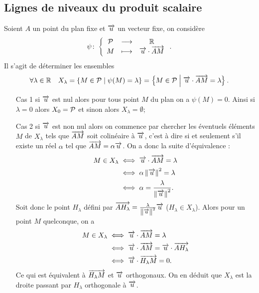 \subsection{Lignes de niveaux du produit scalaire}
Soient \(A\) un point du plan fixe et \(\vu\) un vecteur fixe, on considère
\begin{equation}
  \fonction{\psi}{\P}{\R}{M}{\vu\cdot\vect{AM}}.
\end{equation}
Il s'agit de déterminer les ensembles
\begin{equation}
  \forall \lambda \in \R \quad  X_\lambda = \enstq{M \in \P}{\psi(M)=\lambda}=\enstq{M \in \P}{\vu \cdot \vect{AM} = \lambda}.
\end{equation}
\begin{itemize}
\item[Cas 1] si \(\vu\) est nul alors pour tous point \(M\) du plan on a \(\psi(M)=0\). Ainsi si \(\lambda=0\) alors \(X_0=\P\) et sinon alors \(X_\lambda=\emptyset\);
\item[Cas 2] si \(\vu\) est non nul alors on commence par chercher les éventuels éléments \(M\) de \(X_\lambda\) tels que \(\vect{AM}\) soit colinéaire à \(\vu\), c'est à dire si et seulement s'il existe un réel \(\alpha\) tel que \(\vect{AM}=\alpha \vu\). On a donc la suite d'équivalence :
  \begin{align}
    M \in X_\lambda &\iff  \vu \cdot \vect{AM}=\lambda \\
    & \iff \alpha \norme{\vu}^2=\lambda \\
    & \iff \alpha= \frac{\lambda}{\norme{\vu}^2}.
  \end{align}
  Soit donc le point \(H_\lambda\) défini par \(\vect{AH_\lambda}=\frac{\lambda}{\norme{\vu}^2} \vu\) (\(H_\lambda \in X_\lambda\)). Alors pour un point \(M\) quelconque, on a
  \begin{align}
    M \in X_\lambda &\iff  \vu \cdot \vect{AM}=\lambda \\
    &\iff  \vu \cdot \vect{AM} = \vu \cdot \vect{AH_\lambda} \\
    &\iff  \vu \cdot \vect{H_\lambda M}=0.
  \end{align}
  Ce qui est équivalent à \(\vect{H_\lambda M}\) et \(\vu\) orthogonaux. On en déduit que \(X_\lambda\) est la droite passant par \(H_\lambda\) orthogonale à \(\vu\).
\end{itemize}

